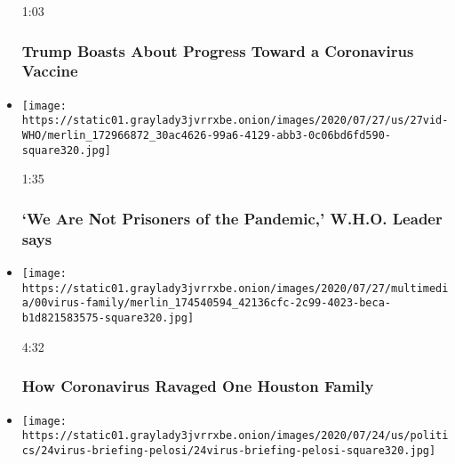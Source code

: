 \begin{itemize}
  1:03

  \hypertarget{trump-boasts-about-progress-toward-a-coronavirus-vaccine}{%
  \subsubsection{Trump Boasts About Progress Toward a Coronavirus
  Vaccine}\label{trump-boasts-about-progress-toward-a-coronavirus-vaccine}}
\item
  \href{https://www.nytimes3xbfgragh.onion/video/world/100000007258544/who-pandemic-response.html?action=click\&module=video-series-bar\&region=header\&pgtype=Article\&playlistId=video/coronavirus-news-update}{}

  \texttt{[image: https://static01.graylady3jvrrxbe.onion/images/2020/07/27/us/27vid-WHO/merlin\_172966872\_30ac4626-99a6-4129-abb3-0c06bd6fd590-square320.jpg]}

  1:35

  \hypertarget{we-are-not-prisoners-of-the-pandemic-who-leader-says}{%
  \subsubsection{`We Are Not Prisoners of the Pandemic,' W.H.O. Leader
  says}\label{we-are-not-prisoners-of-the-pandemic-who-leader-says}}
\item
  \href{https://www.nytimes3xbfgragh.onion/video/us/100000007253343/coronavirus-houston-family.html?action=click\&module=video-series-bar\&region=header\&pgtype=Article\&playlistId=video/coronavirus-news-update}{}

  \texttt{[image: https://static01.graylady3jvrrxbe.onion/images/2020/07/27/multimedia/00virus-family/merlin\_174540594\_42136cfc-2c99-4023-beca-b1d821583575-square320.jpg]}

  4:32

  \hypertarget{how-coronavirus-ravaged-one-houston-family}{%
  \subsubsection{How Coronavirus Ravaged One Houston
  Family}\label{how-coronavirus-ravaged-one-houston-family}}
\item
  \href{https://www.nytimes3xbfgragh.onion/video/us/100000007256158/pelosi-rejects-unemployment-extension.html?action=click\&module=video-series-bar\&region=header\&pgtype=Article\&playlistId=video/coronavirus-news-update}{}

  \texttt{[image: https://static01.graylady3jvrrxbe.onion/images/2020/07/24/us/politics/24virus-briefing-pelosi/24virus-briefing-pelosi-square320.jpg]}


\end{itemize}

